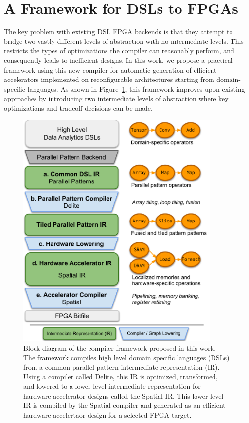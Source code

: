\section{A Framework for DSLs to FPGAs}
The key problem with existing DSL FPGA backends is that they attempt
to bridge two vastly different levels of abstraction with no intermediate
levels. This restricts the types of optimizations the compiler can reasonably
perform, and consequently leads to inefficient designs.
In this work, we propose a practical framework using this
new compiler for automatic generation of
efficient accelerators implemented on reconfigurable architectures starting
from domain-specific languages. As shown in Figure~\ref{fig:system-diag}, this
framework improves upon existing approaches by introducing two intermediate levels of
abstraction where key optimizations and tradeoff decisions can be made.

\begin{figure}
\centering
\includegraphics[height=12cm]{1-intro/figs/system-diag}
\caption{\label{fig:system-diag}Block diagram of the compiler framework proposed in this work.
The framework compiles high level domain specific languages (DSLs) from a
common parallel pattern intermediate representation (IR). Using a compiler
called Delite, this IR is optimized, transformed, and lowered to a lower level
intermediate representation for hardware accelerator designs called the Spatial IR.
This lower level IR is compiled by the Spatial compiler and generated
as an efficient hardware accelertaor design for a selected FPGA target.}
\end{figure}

